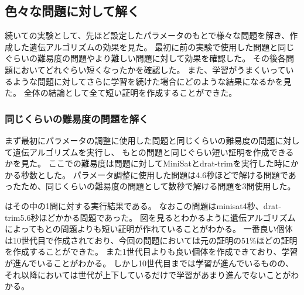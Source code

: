 








\subsection{色々な問題に対して解く}%



続いての実験として、先ほど設定したパラメータのもとで様々な問題を解き、作成した遺伝アルゴリズムの効果を見た。
最初に前の実験で使用した問題と同じぐらいの難易度の問題やより難しい問題に対して効果を確認した。
その後各問題においてどれぐらい短くなったかを確認した。
また、学習がうまくいっているような問題に対してさらに学習を続けた場合にどのような結果になるかを見た。
全体の結論として全て短い証明を作成することができた。



\subsubsection{同じくらいの難易度の問題を解く}

まず最初にパラメータの調整に使用した問題と同じくらいの難易度の問題に対して遺伝アルゴリズムを実行し、
もとの問題と同じぐらい短い証明を作成できるかを見た。
ここでの難易度は問題に対してMiniSatとdrat-trimを実行した時にかかる秒数とした。
パラメータ調整に使用した問題は4.6秒ほどで解ける問題であったため、同じくらいの難易度の問題として数秒で解ける問題を3問使用した。


はその中の1問に対する実行結果である。
なおこの問題はminisat4秒、drat-trim5.6秒ほどかかる問題であった。
図を見るとわかるように遺伝アルゴリズムによってもとの問題よりも短い証明が作れていることがわかる。
一番良い個体は10世代目で作成されており、今回の問題においては元の証明の51\%ほどの証明を作成することができた。
また1世代目よりも良い個体を作成できており、学習が進んでいることがわかる。
しかし10世代目までは学習が進んでいるものの、それ以降においては世代が上下しているだけで学習があまり進んでないことがわかる。




